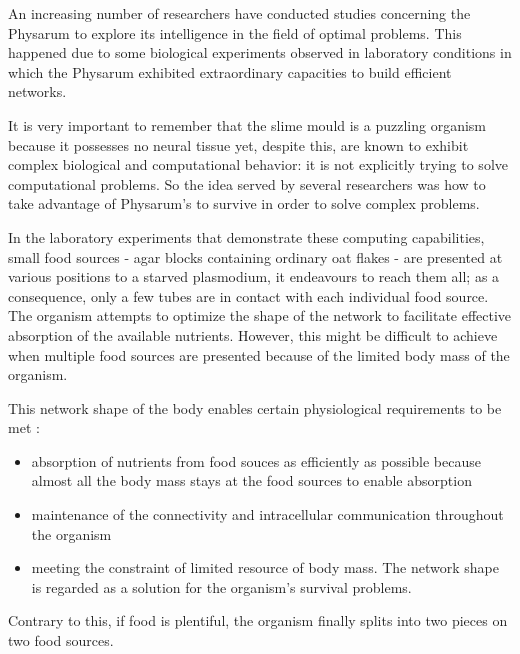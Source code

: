 An increasing number of researchers have conducted studies concerning the Physarum to explore its intelligence in the field of optimal problems. This happened due to some biological experiments observed in laboratory conditions in which the Physarum exhibited extraordinary capacities to build efficient networks.
\par
It is very important to remember that the slime mould is a puzzling organism because it possesses no neural tissue yet, despite this, are known to exhibit complex biological and computational behavior: it is not explicitly trying to solve computational problems. So the idea served by several researchers was how to take advantage of Physarum’s to survive in order to solve complex problems. 
\par
In the laboratory experiments that demonstrate these computing capabilities, small food sources - agar blocks containing ordinary oat flakes - are presented at various positions to a starved plasmodium, it endeavours to reach them all; as a consequence, only a few tubes are in contact with each individual food source.  The organism attempts to optimize the shape of the network to facilitate effective absorption of the available nutrients. However, this might be difficult to achieve when multiple food sources are presented because of the limited body mass of the organism.
\par
This network shape of the body enables certain physiological requirements to be met \cite{nakagaki2004obtaining}:
\begin{itemize}
	\item absorption of nutrients from food souces as efficiently as possible because almost all the body mass stays at the food sources to enable absorption
	\item maintenance of the connectivity and intracellular communication throughout the organism
	\item meeting the constraint of limited resource of body mass. The network shape is regarded as a solution for the
organism’s survival problems.
\end{itemize}

Contrary to this, if food is plentiful, the organism finally splits into two pieces on two food sources.

